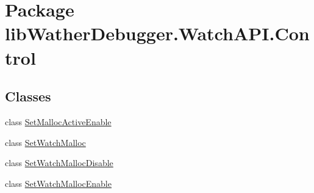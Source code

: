 \hypertarget{namespacelib_wather_debugger_1_1_watch_a_p_i_1_1_control}{\section{Package lib\+Wather\+Debugger.\+Watch\+A\+P\+I.\+Control}
\label{namespacelib_wather_debugger_1_1_watch_a_p_i_1_1_control}
}
\subsection*{Classes}
\begin{DoxyCompactItemize}
\item 
class \hyperlink{classlib_wather_debugger_1_1_watch_a_p_i_1_1_control_1_1_set_malloc_active_enable}{Set\+Malloc\+Active\+Enable}
\item 
class \hyperlink{classlib_wather_debugger_1_1_watch_a_p_i_1_1_control_1_1_set_watch_malloc}{Set\+Watch\+Malloc}
\item 
class \hyperlink{classlib_wather_debugger_1_1_watch_a_p_i_1_1_control_1_1_set_watch_malloc_disable}{Set\+Watch\+Malloc\+Disable}
\item 
class \hyperlink{classlib_wather_debugger_1_1_watch_a_p_i_1_1_control_1_1_set_watch_malloc_enable}{Set\+Watch\+Malloc\+Enable}
\end{DoxyCompactItemize}
